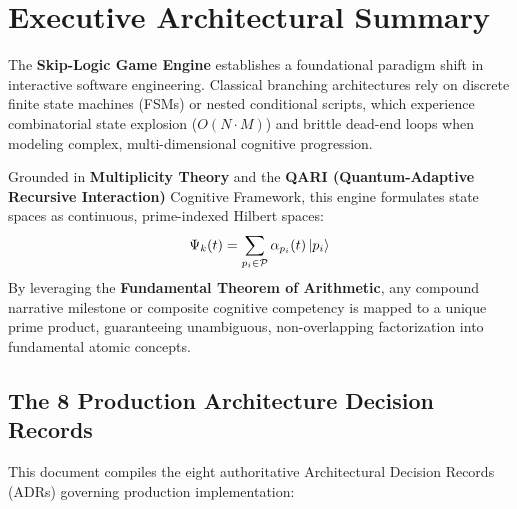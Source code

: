 \documentclass[11pt,a4paper]{article}
\begin{document}
\tableofcontents
\newpage

\section*{Executive Architectural Summary}

The \textbf{Skip-Logic Game Engine} establishes a foundational paradigm shift in interactive software engineering. Classical branching architectures rely on discrete finite state machines (FSMs) or nested conditional scripts, which experience combinatorial state explosion ($O(N \cdot M)$) and brittle dead-end loops when modeling complex, multi-dimensional cognitive progression.

Grounded in \textbf{Multiplicity Theory} and the \textbf{QARI (Quantum-Adaptive Recursive Interaction)} Cognitive Framework, this engine formulates state spaces as continuous, prime-indexed Hilbert spaces:
\begin{equation*}
\Psi_k(t) = \sum_{p_i \in \mathcal{P}} \alpha_{p_i}(t) \ket{p_i}
\end{equation*}
By leveraging the \textbf{Fundamental Theorem of Arithmetic}, any compound narrative milestone or composite cognitive competency is mapped to a unique prime product, guaranteeing unambiguous, non-overlapping factorization into fundamental atomic concepts.

\subsection*{The 8 Production Architecture Decision Records}
This document compiles the eight authoritative Architectural Decision Records (ADRs) governing production implementation:
\end{document}
